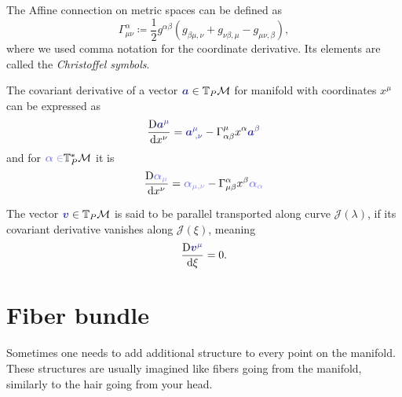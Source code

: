 \begin{definition}
The Affine connection on metric spaces can be defined as
    \begin{equation}
        \Gamma^{\alpha}_{\mu\nu} \coloneqq \frac{1}{2}g^{\alpha \beta}\left(g_{\beta\mu,\nu}+g_{\nu\beta,\mu}-g_{\mu\nu,\beta}\right),
    \end{equation}
    where we used comma notation for the coordinate derivative. Its elements are called the \emph{Christoffel symbols}.
\end{definition}
    The covariant derivative of a vector $\bluee{\bm a}\in \T_P\M$ for manifold with coordinates $x^\mu$ can be expressed as
    \begin{equation}
        \Der{\bluee{\bm a^\mu}}{x^\nu}=\bluee{\bm a_{\;,\nu}^\mu}-\Gamma^\mu_{\alpha\beta} x^\alpha \bluee{\bm a^\beta}
    \end{equation}
    and for $\blueee{\bm\alpha\in} \T_P^*\M$ it is
\begin{equation}
    \Der{\blueee{\bm \alpha_\mu}}{x^\nu}=\blueee{\bm \alpha_{\mu,\nu}}-\Gamma^\alpha_{\mu\beta}x^\beta \blueee{\bm \alpha_\alpha}
\end{equation}

The vector $\bluee{\bm v}\in \T_P\M$ is said to be parallel transported along curve $\mathcal J(\lambda)$, if its covariant derivative vanishes along $\mathcal J(\xi)$, meaning
\begin{equation}
    \Der{\bluee{\bm v^\mu}}{\xi}=0.
\end{equation}

\section{Fiber bundle}
\label{sec:bundleDef}
Sometimes one needs to add additional structure to every point on the manifold. These structures are usually imagined like fibers going from the manifold, similarly to the hair going from your head.

